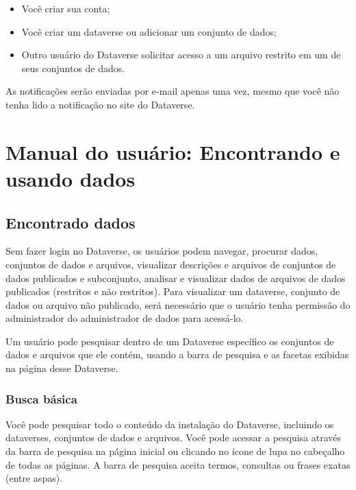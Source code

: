 \documentclass[12pt,hidelinks]{article}
\begin{document}
\begin{itemize} 
\item Você criar sua conta;
\item Você criar um dataverse ou adicionar um conjunto de dados;
\item Outro usuário do Dataverse solicitar acesso a um arquivo restrito em um de seus conjuntos de dados.
\end{itemize}	

As notificações serão enviadas por e-mail apenas uma vez, mesmo que você não tenha lido a notificação no site do Dataverse.

\newpage
     	
\section{Manual do usuário: Encontrando e usando dados}
\vspace{10.5cm}

	\subsection{Encontrado dados}
	
\qquad Sem fazer login no Dataverse, os usuários podem navegar, procurar dados, conjuntos de dados e arquivos, visualizar descrições e arquivos de conjuntos de dados publicados e subconjunto, analisar e visualizar dados de arquivos de dados publicados (restritos e não restritos). Para visualizar um dataverse, conjunto de dados ou arquivo não publicado, será necessário que o usuário tenha permissão do administrador do administrador de dados para acessá-lo.

Um usuário pode pesquisar dentro de um Dataverse específico os conjuntos de dados e arquivos que ele contém, usando a barra de pesquisa e as facetas exibidas na página desse Dataverse.
	
	    \subsubsection{Busca básica}
	    
\qquad Você pode pesquisar todo o conteúdo da instalação do Dataverse, incluindo os dataverses, conjuntos de dados e arquivos. Você pode acessar a pesquisa através da barra de pesquisa na página inicial ou clicando no ícone de lupa no cabeçalho de todas as páginas. A barra de pesquisa aceita termos, consultas ou frases exatas (entre aspas).\\
	    
\end{document}
